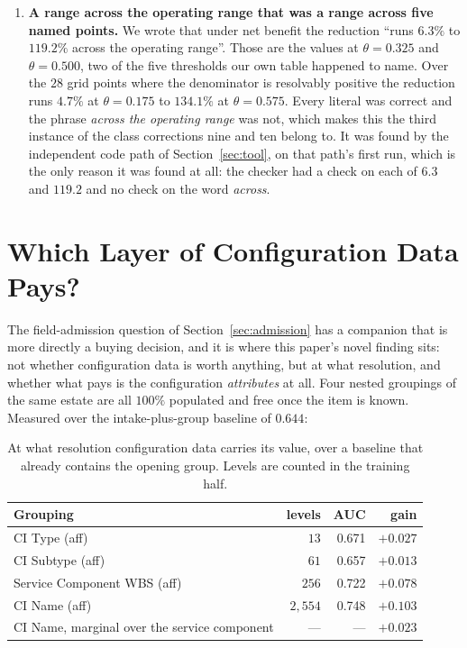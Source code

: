 \documentclass[preprint,12pt]{elsarticle}
\begin{document}
\begin{enumerate}
\item \textbf{A range across the operating range that was a range across five
named points.} We wrote that under net benefit the reduction ``runs $6.3\%$ to
$119.2\%$ across the operating range''. Those are the values at
$\theta = 0.325$ and $\theta = 0.500$, two of the five thresholds our own
table happened to name. Over the $28$ grid points where the denominator is
resolvably positive the reduction runs $4.7\%$ at $\theta = 0.175$ to
$134.1\%$ at $\theta = 0.575$. Every literal was correct and the phrase
\emph{across the operating range} was not, which makes this the third instance
of the class corrections nine and ten belong to. It was found by the
independent code path of Section~\ref{sec:tool}, on that path's first run,
which is the only reason it was found at all: the checker had a check on each
of $6.3$ and $119.2$ and no check on the word \emph{across}.
\end{enumerate}

\section{Which Layer of Configuration Data Pays?}
\label{sec:layer}

The field-admission question of Section~\ref{sec:admission} has a companion
that is more directly a buying decision, and it is where this paper's
novel finding sits: not whether configuration data is worth anything, but at
what resolution, and whether what pays is the configuration \emph{attributes}
at all. Four nested groupings of the same estate are all $100\%$ populated and
free once the item is known. Measured over the intake-plus-group baseline of
$0.644$:

\begin{table}[t]
\centering\small
\begin{tabular}{@{}lrrr@{}}
\toprule
Grouping & levels & AUC & gain \\
\midrule
CI Type (aff)               & $13$    & 0.671 & $+0.027$ \\
CI Subtype (aff)            & $61$    & 0.657 & $+0.013$ \\
Service Component WBS (aff) & $256$   & 0.722 & $+0.078$ \\
CI Name (aff)               & $2{,}554$ & 0.748 & $+0.103$ \\
\midrule
CI Name, marginal over the service component & --- & --- & $+0.023$ \\
\bottomrule
\end{tabular}
\caption{At what resolution configuration data carries its value, over a
baseline that already contains the opening group. Levels are counted in the
training half.}
\label{tab:resolution}
\end{table}
\end{document}
